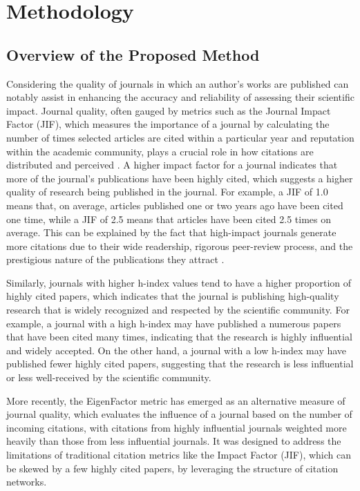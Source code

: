 \chapter{Methodology}
\label{ch:methods}

\section{Overview of the Proposed Method}

Considering the quality of journals in which an author's works are published
can notably assist in enhancing the accuracy and reliability of assessing their
scientific impact. Journal quality, often gauged by metrics such as the Journal
Impact Factor (JIF), which measures the importance of a journal by calculating
the number of times selected articles are cited within a particular year and
reputation within the academic community, plays a crucial role in how citations
are distributed and perceived \cite{garfield1999journal, garfield2006history}.
A higher impact factor for a journal indicates that more of the journal's
publications have been highly cited, which suggests a higher quality of
research being published in the journal. For example, a JIF of 1.0 means that,
on average, articles published one or two years ago have been cited one time,
while a JIF of 2.5 means that articles have been cited 2.5 times on average.
This can be explained by the fact that high-impact journals generate more
citations due to their wide readership, rigorous peer-review process, and the
prestigious nature of the publications they attract \cite{garfield2006history}.

Similarly, journals with higher h-index values tend to have a higher proportion
of highly cited papers, which indicates that the journal is publishing
high-quality research that is widely recognized and respected by the scientific
community. For example, a journal with a high h-index may have published a
numerous papers that have been cited many times, indicating that the research
is highly influential and widely accepted. On the other hand, a journal with a
low h-index may have published fewer highly cited papers, suggesting that the
research is less influential or less well-received by the scientific community.

More recently, the EigenFactor metric has emerged as an alternative measure of
journal quality, which evaluates the influence of a journal based on the number
of incoming citations, with citations from highly influential journals weighted
more heavily than those from less influential journals. It was designed to
address the limitations of traditional citation metrics like the Impact Factor
(JIF), which can be skewed by a few highly cited papers, by leveraging the
structure of citation networks.

